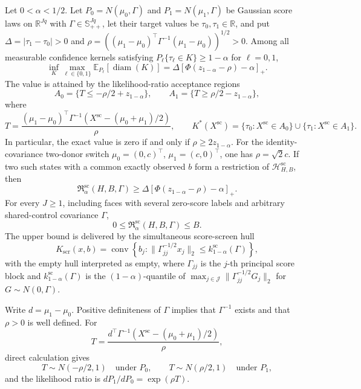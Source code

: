 Let \(0<\alpha<1/2\). Let \(P_0=N(\mu_0,\Gamma)\) and \(P_1=N(\mu_1,\Gamma)\) be Gaussian score laws on \(\mathbb R^{Jq}\) with \(\Gamma\in\mathbb S_{++}^{Jq}\), let their target values be \(\tau_0,\tau_1\in\mathbb R\), and put \(\Delta=|\tau_1-\tau_0|>0\) and \(\rho=((\mu_1-\mu_0)^{\top}\Gamma^{-1}(\mu_1-\mu_0))^{1/2}>0\). Among all measurable confidence kernels satisfying \(P_\ell\{\tau_\ell\in K\}\geq1-\alpha\) for \(\ell=0,1\),
\[
 \inf_K\max_{\ell\in\{0,1\}}
 \mathbb E_{P_\ell}[\operatorname{diam}(K)]
 =\Delta[\Phi(z_{1-\alpha}-\rho)-\alpha]_+.
\]
The value is attained by the likelihood-ratio acceptance regions
\[
 A_0=\{T\leq-\rho/2+z_{1-\alpha}\},
 \qquad
 A_1=\{T\geq\rho/2-z_{1-\alpha}\},
\]
where
\[
 T=\frac{(\mu_1-\mu_0)^{\top}\Gamma^{-1}
 (X^{\mathrm{sc}}-(\mu_0+\mu_1)/2)}{\rho},
 \qquad
 K^*(X^{\mathrm{sc}})=
 \{\tau_0:X^{\mathrm{sc}}\in A_0\}\cup
 \{\tau_1:X^{\mathrm{sc}}\in A_1\}.
\]
In particular, the exact value is zero if and only if \(\rho\geq2z_{1-\alpha}\). For the identity-covariance two-donor switch \(\mu_0=(0,c)^{\top}\), \(\mu_1=(c,0)^{\top}\), one has \(\rho=\sqrt2c\). If two such states with a common exactly observed \(b\) form a restriction of \(\mathcal H_{H,B}^{\mathrm{sc}}\), then
\[
 \mathfrak R_{\alpha}^{\mathrm{sc}}(H,B,\Gamma)
 \geq\Delta[\Phi(z_{1-\alpha}-\rho)-\alpha]_+.
\]
For every \(J\geq1\), including faces with several zero-score labels and arbitrary shared-control covariance \(\Gamma\),
\[
 0\leq\mathfrak R_{\alpha}^{\mathrm{sc}}(H,B,\Gamma)\leq B.
\]
The upper bound is delivered by the simultaneous score-screen hull
\[
 K_{\mathrm{scr}}(x,b)
 =\operatorname{conv}\left\{b_j:
 \lVert\Gamma_{jj}^{-1/2}x_j\rVert_2\leq k_{1-\alpha}^{\mathrm{sc}}(\Gamma)
 \right\},
\]
with the empty hull interpreted as empty, where \(\Gamma_{jj}\) is the \(j\)-th principal score block and \(k_{1-\alpha}^{\mathrm{sc}}(\Gamma)\) is the \((1-\alpha)\)-quantile of \(\max_{j\in\mathcal J}\lVert\Gamma_{jj}^{-1/2}G_j\rVert_2\) for \(G\sim N(0,\Gamma)\).

Write \(d=\mu_1-\mu_0\). Positive definiteness of \(\Gamma\) implies that \(\Gamma^{-1}\) exists and that \(\rho>0\) is well defined. For
\[
 T=\frac{d^{\top}\Gamma^{-1}(X^{\mathrm{sc}}-(\mu_0+\mu_1)/2)}{\rho},
\]
direct calculation gives
\[
 T\sim N(-\rho/2,1)\quad\text{under }P_0,
 \qquad
 T\sim N(\rho/2,1)\quad\text{under }P_1,
 \tag{9}
\]
and the likelihood ratio is \(dP_1/dP_0=\exp(\rho T)\).


